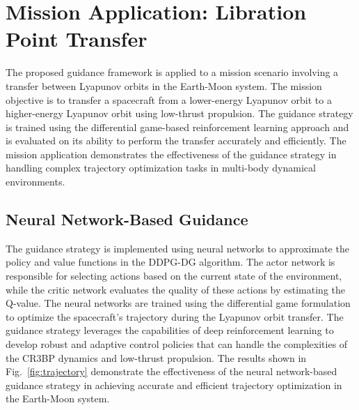 \documentclass[conference]{IEEEtran}
\begin{document}
\section{Mission Application: Libration Point Transfer}
The proposed guidance framework is applied to a mission scenario involving a transfer between Lyapunov orbits in the Earth-Moon system. The mission objective is to transfer a spacecraft from a lower-energy Lyapunov orbit to a higher-energy Lyapunov orbit using low-thrust propulsion. The guidance strategy is trained using the differential game-based reinforcement learning approach and is evaluated on its ability to perform the transfer accurately and efficiently. The mission application demonstrates the effectiveness of the guidance strategy in handling complex trajectory optimization tasks in multi-body dynamical environments.

\subsection{Neural Network-Based Guidance}
The guidance strategy is implemented using neural networks to approximate the policy and value functions in the DDPG-DG algorithm. The actor network is responsible for selecting actions based on the current state of the environment, while the critic network evaluates the quality of these actions by estimating the Q-value. The neural networks are trained using the differential game formulation to optimize the spacecraft's trajectory during the Lyapunov orbit transfer. The guidance strategy leverages the capabilities of deep reinforcement learning to develop robust and adaptive control policies that can handle the complexities of the CR3BP dynamics and low-thrust propulsion. The results shown in Fig.~\ref{fig:trajectory} demonstrate the effectiveness of the neural network-based guidance strategy in achieving accurate and efficient trajectory optimization in the Earth-Moon system.





\end{document}
